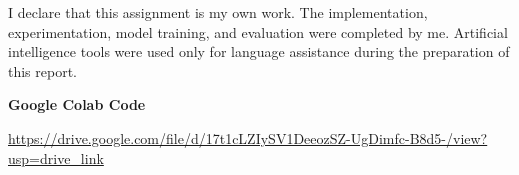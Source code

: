 \documentclass[conference,a4paper]{IEEEtran}
\begin{document}
I declare that this assignment is my own work. The implementation, experimentation, model training, and evaluation were completed by me. Artificial intelligence tools were used only for language assistance during the preparation of this report.

\textbf{Google Colab Code}

\url{https://drive.google.com/file/d/17t1cLZIySV1DeeozSZ-UgDimfc-B8d5-/view?usp=drive_link}



\end{document}

